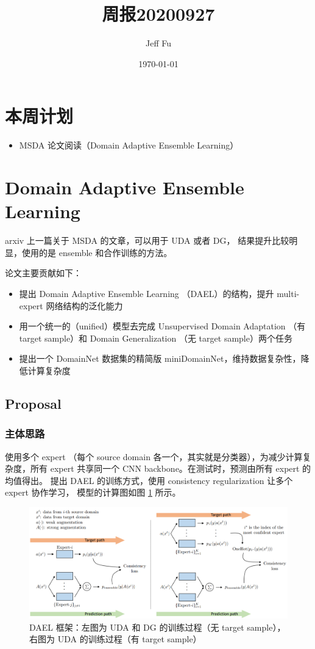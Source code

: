 \documentclass[UTF8]{ctexart}
\title{周报20200927}
\author{Jeff Fu}
\date{\today}
\begin{document}
\maketitle
\section{本周计划}
\begin{itemize}
    \item MSDA 论文阅读（Domain Adaptive Ensemble Learning）
\end{itemize}

\section{Domain Adaptive Ensemble Learning}

arxiv 上一篇关于 MSDA 的文章，可以用于 UDA 或者 DG，
结果提升比较明显，使用的是 ensemble 和合作训练的方法。

论文主要贡献如下：

\begin{itemize}
    \item 提出 Domain Adaptive Ensemble Learning （DAEL）的结构，提升 multi-expert 网络结构的泛化能力
    \item 用一个统一的（unified）模型去完成 Unsupervised Domain Adaptation （有 target sample）和 Domain Generalization （无 target sample）两个任务
    \item 提出一个 DomainNet 数据集的精简版 miniDomainNet，维持数据复杂性，降低计算复杂度
\end{itemize}

\subsection{Proposal}

\subsubsection{主体思路}

使用多个 expert （每个 source domain 各一个，其实就是分类器），为减少计算复杂度，所有 expert 共享同一个 CNN backbone。在测试时，预测由所有 expert 的均值得出。
提出 DAEL 的训练方式，使用 consistency regularization 让多个 expert 协作学习，
模型的计算图如图 \ref{fig:DAEL} 所示。

\begin{figure}[ht]
    \centering
    \includegraphics[scale=0.33]{20200927_DAEL.png}
    \caption{DAEL 框架：左图为 UDA 和 DG 的训练过程（无 target sample），右图为 UDA 的训练过程（有 target sample）}
    \label{fig:DAEL}
\end{figure}
\end{document}
